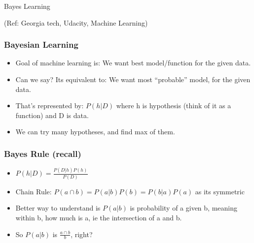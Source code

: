 \begin{frame}[fragile]\frametitle{}
\begin{center}
{\Large Bayes Learning}

{\tiny (Ref: Georgia tech, Udacity, Machine Learning)}

\end{center}


\end{frame}

\begin{frame}[fragile]\frametitle{Bayesian Learning}

\begin{itemize}
\item Goal of machine learning is: We want best model/function for the given data. 
\item Can we say? Its equivalent to: We want most ``probable'' model, for the given data.
\item That's represented by: $P(h|D)$ where h is hypothesis (think of it as a function) and D is data.
\item We can try many hypotheses, and find max of them.

\end{itemize}

\end{frame}

\begin{frame}[fragile]\frametitle{Bayes Rule (recall)}

\begin{itemize}
\item $P(h|D) = \frac{P(D|h)P(h)}{P(D)}$
\item Chain Rule: $P(a \cap b) = P(a|b)P(b) = P(b|a)P(a)$ as its symmetric
\item Better way to understand is $P(a|b)$ is probability of a given b, meaning within b, how much is a, ie the intersection of a and b. 
\item So $P(a|b)$ is $\frac{a \cap b}{b}$, right?
\end{itemize}

\end{frame}

